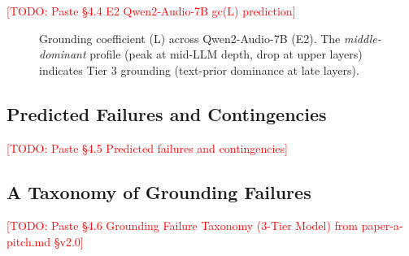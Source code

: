 \documentclass{article}
\newcommand{\gc}{\text{gc}}
\newcommand{\todo}[1]{\textcolor{red}{[TODO: #1]}}
\begin{document}

\todo{Paste §4.4 E2 Qwen2-Audio-7B gc(L) prediction}

\begin{figure}[h]
  \centering
  \caption{Grounding coefficient \gc(L) across Qwen2-Audio-7B (E2).
    The \textit{middle-dominant} profile (peak at mid-LLM depth, drop at upper layers)
    indicates Tier 3 grounding (text-prior dominance at late layers).}
  \label{fig:e2_qwen}
\end{figure}

\subsection{Predicted Failures and Contingencies}
\label{sec:contingencies}


\todo{Paste §4.5 Predicted failures and contingencies}

\subsection{A Taxonomy of Grounding Failures}
\label{sec:taxonomy}


\todo{Paste §4.6 Grounding Failure Taxonomy (3-Tier Model) from paper-a-pitch.md §v2.0}
\end{document}
